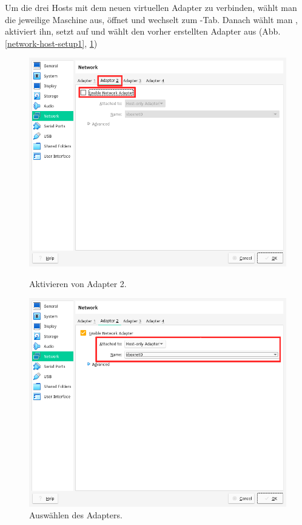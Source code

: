 Um die drei Hosts mit dem neuen virtuellen Adapter zu verbinden, wählt man die jeweilige Maschine aus, öffnet  und wechselt zum -Tab. Danach wählt man , aktiviert ihn, setzt  auf  und wählt den vorher erstellten Adapter aus (Abb. \ref{network-host-setup1}, \ref{network-host-setup2})

\begin{figure}[H]
  \begin{minipage}[t]{0.45\textwidth}
    \centering
    \includegraphics[width=\textwidth]{graphics/setup/network-host-setup1.png}
    \caption{Aktivieren von Adapter 2.}\label{network-host-setup1}
  \end{minipage}\hfill
  \begin{minipage}[t]{0.45\textwidth}
    \centering
    \includegraphics[width=\textwidth]{graphics/setup/network-host-setup2.png}
    \caption{Auswählen des Adapters.}\label{network-host-setup2}
   \end{minipage}
\end{figure}


